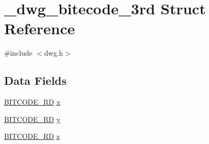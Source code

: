 \hypertarget{struct__dwg__bitecode__3rd}{\section{\-\_\-dwg\-\_\-bitecode\-\_\-3rd \-Struct \-Reference}
\label{struct__dwg__bitecode__3rd}
}


{\ttfamily \#include $<$dwg.\-h$>$}

\subsection*{\-Data \-Fields}
\begin{DoxyCompactItemize}
\item 
\hyperlink{dwg_8h_a309e7e59a4030a89943640d0d327cef7}{\-B\-I\-T\-C\-O\-D\-E\-\_\-\-R\-D} \hyperlink{struct__dwg__bitecode__3rd_a7d2bd8794e5c3ad15aeb87584631f6ae}{x}
\item 
\hyperlink{dwg_8h_a309e7e59a4030a89943640d0d327cef7}{\-B\-I\-T\-C\-O\-D\-E\-\_\-\-R\-D} \hyperlink{struct__dwg__bitecode__3rd_a43e6aa434ef456e73fbc9647c6ca63a5}{y}
\item 
\hyperlink{dwg_8h_a309e7e59a4030a89943640d0d327cef7}{\-B\-I\-T\-C\-O\-D\-E\-\_\-\-R\-D} \hyperlink{struct__dwg__bitecode__3rd_a4a2a9a6560e774f25d562513f7aee734}{z}
\end{DoxyCompactItemize}


